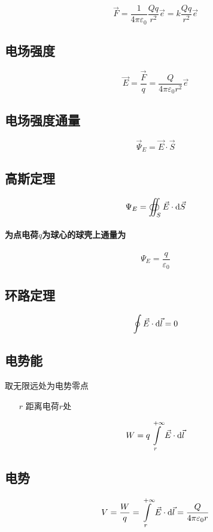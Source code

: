 \documentclass{article}
\begin{document}
\[\vec F=\frac1{4\pi\varepsilon_0}\frac{Qq}{r^2}\vec e=k\frac{Qq}{r^2}\vec e\]

\subsection{电场强度}

\[\vec E=\frac{\vec F}q=\frac Q{4\pi\varepsilon_0r^2}\vec e\]

\subsection{电场强度通量}

\[\vec\Psi_E=\vec E\cdot\vec S\]

\subsection{高斯定理}

\[\Psi_E=\oiint_S\vec E\cdot\mathrm d\vec S\]

\paragraph{为点电荷$q$为球心的球壳上通量为}

\[\Psi_E=\frac q{\varepsilon_0}\]

\subsection{环路定理}

\[\oint\vec E\cdot\mathrm d\vec l=0\]

\subsection{电势能}

取无限远处为电势零点

\begin{enumerate}
    \item[$r$] 距离电荷$r$处
\end{enumerate}

\[W=q\int\limits_r^{+\infty}\vec E\cdot\mathrm d\vec l\]

\subsection{电势}

\[V=\frac Wq=\int\limits_r^{+\infty}\vec E\cdot\mathrm d\vec l=\frac Q{4\pi\varepsilon_0r}\]
\end{document}
